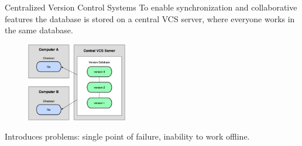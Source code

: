 \documentclass{beamer}
\def \figureHeight {130px}
\begin{document}
\begin{frame}{Centralized Version Control Systems}
To enable synchronization and collaborative features the database is stored on a central VCS server, where everyone works in the same database.
\begin{figure}
   \includegraphics[height=\figureHeight]{images/central-version-control.png}
\end{figure}
Introduces problems: single point of failure, inability to work offline.
\end{frame}
\end{document}
